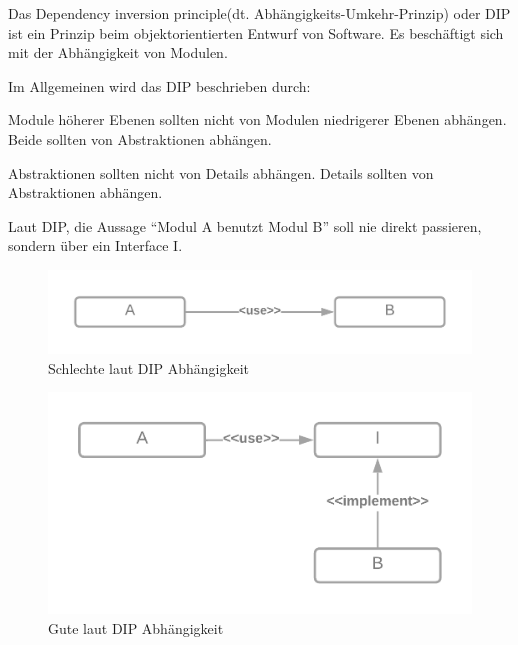 Das Dependency inversion principle(dt. Abhängigkeits-Umkehr-Prinzip) oder DIP ist ein Prinzip 
beim objektorientierten Entwurf von Software. Es beschäftigt sich mit der Abhängigkeit von Modulen.

Im Allgemeinen wird das DIP beschrieben durch:

Module höherer Ebenen sollten nicht von Modulen niedrigerer Ebenen abhängen.
Beide sollten von Abstraktionen abhängen.


Abstraktionen sollten nicht von Details abhängen.
Details sollten von Abstraktionen abhängen.

Laut DIP, die Aussage ``Modul A benutzt Modul B'' soll nie direkt passieren, sondern über ein Interface I.

\begin{figure}[H]
    \centering
    \includegraphics[width=1\textwidth]{./images/DIP - bad.png}
    \caption[Schlechte laut DIP Abhängigkeit]{Schlechte laut DIP Abhängigkeit \footnotemark}
    \label{fig:MVP}
\end{figure}


\begin{figure}[H]
    \centering
    \includegraphics[width=1\textwidth]{./images/DIP - good.png}
    \caption[Gute laut DIP Abhängigkeit]{Gute laut DIP Abhängigkeit \footnotemark}
    \label{fig:MVP}
\end{figure}

